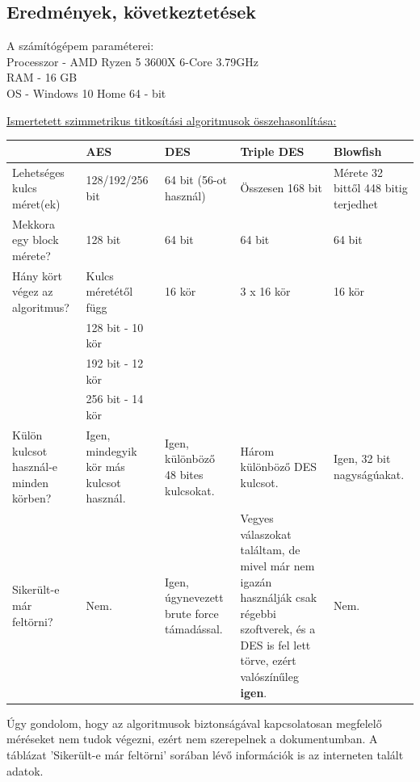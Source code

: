 \subsection{Eredmények, következtetések}
A számítógépem paraméterei:
\\ Processzor - AMD Ryzen 5 3600X 6-Core 3.79GHz
\\ RAM - 16 GB
\\ OS - Windows 10 Home 64 - bit

\vspace{10pt} \noindent \underline{Ismertetett szimmetrikus titkosítási algoritmusok összehasonlítása:}

\begin{center}
	
	
	\begin{tabular}{|p{2.4cm}|p{2.7cm}|p{2.7cm}|p{2.7cm}|p{2.7cm}|}
		\hline
		 & \textbf{AES} & \textbf{DES} & \textbf{Triple DES}  & \textbf{Blowfish} \\
		\hline
		Lehetséges kulcs méret(ek) & 128/192/256 bit & 64 bit (56-ot használ) & Összesen 168 bit & Mérete 32 bittől 448 bitig terjedhet \\
		\hline
		Mekkora egy block mérete? & 128 bit & 64 bit & 64 bit & 64 bit \\
		\hline
		Hány kört végez az algoritmus? & Kulcs méretétől függ  & 16 kör & 3 x 16 kör & 16 kör \\
		 & 128 bit - 10 kör & & & \\
		 & 192 bit - 12 kör & & & \\
		 & 256 bit - 14 kör & & & \\
		\hline
		Külön kulcsot használ-e minden körben? & Igen, mindegyik kör más kulcsot használ. & Igen, különböző 48 bites kulcsokat. & Három különböző DES kulcsot. & Igen, 32 bit nagyságúakat. \\
		\hline
		Sikerült-e már feltörni? & Nem. & Igen, úgynevezett brute force támadással. & Vegyes válaszokat találtam, de mivel már nem igazán használják csak régebbi szoftverek, és a DES is fel lett törve, ezért valószínűleg \textbf{igen}. & Nem. \\
		\hline
	\end{tabular}
\end{center}
Úgy gondolom, hogy az algoritmusok biztonságával kapcsolatosan megfelelő méréseket nem tudok végezni, ezért nem szerepelnek a dokumentumban. A táblázat ’Sikerült-e már feltörni’ sorában lévő információk is az interneten talált adatok.\newline

